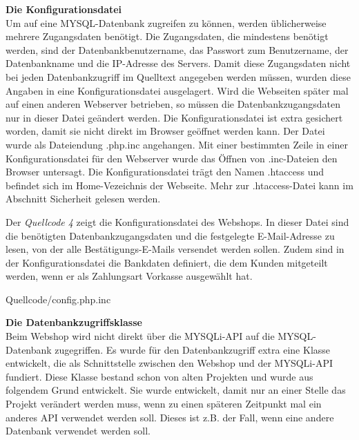 \textbf{Die Konfigurationsdatei}\\
Um auf eine MYSQL-Datenbank zugreifen zu können, werden üblicherweise mehrere Zugangsdaten benötigt. Die Zugangsdaten, die mindestens benötigt werden, sind der Datenbankbenutzername, das Passwort zum Benutzername, der Datenbankname und die IP-Adresse des Servers. Damit diese Zugangsdaten nicht bei jeden Datenbankzugriff im Quelltext angegeben werden müssen, wurden diese Angaben in eine Konfigurationsdatei ausgelagert. Wird die Webseiten später mal auf einen anderen Webserver betrieben, so müssen die Datenbankzugangsdaten nur in dieser Datei geändert werden. Die Konfigurationsdatei ist extra gesichert worden, damit sie nicht direkt im Browser geöffnet werden kann. Der Datei wurde als Dateiendung \glqq *.php.inc\grqq{} angehangen. Mit einer bestimmten Zeile in einer Konfigurationsdatei für den Webserver wurde das Öffnen von \glqq *.inc\grqq{}-Dateien den Browser untersagt. Die Konfigurationsdatei trägt den Namen \glqq .htaccess\grqq{} und befindet sich im Home-Vezeichnis der Webseite. Mehr zur \glqq .htaccess\grqq{}-Datei kann im Abschnitt \glqq Sicherheit\grqq{} gelesen werden.

Der \textit{Quellcode 4} zeigt die Konfigurationsdatei des Webshops. In dieser Datei sind die benötigten Datenbankzugangsdaten und die festgelegte E-Mail-Adresse zu lesen, von der alle Bestätigungs-E-Mails versendet werden sollen. Zudem sind in der Konfigurationsdatei die Bankdaten definiert, die dem Kunden mitgeteilt werden, wenn er als Zahlungsart \glqq Vorkasse\grqq{} ausgewählt hat.
\newpage
\begin{center}
	\begin{lstinputlisting}[language=PHP, caption={Die Konfigurationsdatei}]
		{Quellcode/config.php.inc}
	\end{lstinputlisting}
\end{center}

\textbf{Die Datenbankzugriffsklasse}\\
Beim Webshop wird nicht direkt über die \glqq MYSQLi\grqq{}-API auf die MYSQL-Datenbank zugegriffen. Es wurde für den Datenbankzugriff extra eine Klasse entwickelt, die als Schnittstelle zwischen den Webshop und der \glqq MYSQLi\grqq{}-API fundiert. Diese Klasse bestand schon von alten Projekten und wurde aus folgendem Grund entwickelt. Sie wurde entwickelt, damit nur an einer Stelle das Projekt verändert werden muss, wenn zu einen späteren Zeitpunkt mal ein anderes API verwendet werden soll. Dieses ist z.B. der Fall, wenn eine andere Datenbank verwendet werden soll.

